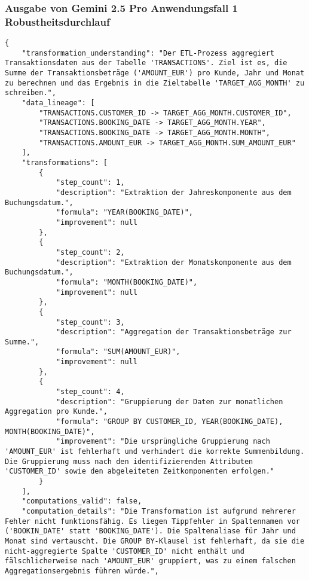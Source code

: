 \subsubsection{Ausgabe von Gemini 2.5 Pro Anwendungsfall 1 Robustheitsdurchlauf}\label{anhang:subsubsec:gemini_case1_prompt3}
\begin{lstlisting}[caption={Ausgabe: Gemini 2.5 Pro Anwendungsfall 1 Robustheitsdurchlauf},label={gemini_case1_prompt3}]
{
    "transformation_understanding": "Der ETL-Prozess aggregiert Transaktionsdaten aus der Tabelle 'TRANSACTIONS'. Ziel ist es, die Summe der Transaktionsbeträge ('AMOUNT_EUR') pro Kunde, Jahr und Monat zu berechnen und das Ergebnis in die Zieltabelle 'TARGET_AGG_MONTH' zu schreiben.",
    "data_lineage": [
        "TRANSACTIONS.CUSTOMER_ID -> TARGET_AGG_MONTH.CUSTOMER_ID",
        "TRANSACTIONS.BOOKING_DATE -> TARGET_AGG_MONTH.YEAR",
        "TRANSACTIONS.BOOKING_DATE -> TARGET_AGG_MONTH.MONTH",
        "TRANSACTIONS.AMOUNT_EUR -> TARGET_AGG_MONTH.SUM_AMOUNT_EUR"
    ],
    "transformations": [
        {
            "step_count": 1,
            "description": "Extraktion der Jahreskomponente aus dem Buchungsdatum.",
            "formula": "YEAR(BOOKING_DATE)",
            "improvement": null
        },
        {
            "step_count": 2,
            "description": "Extraktion der Monatskomponente aus dem Buchungsdatum.",
            "formula": "MONTH(BOOKING_DATE)",
            "improvement": null
        },
        {
            "step_count": 3,
            "description": "Aggregation der Transaktionsbeträge zur Summe.",
            "formula": "SUM(AMOUNT_EUR)",
            "improvement": null
        },
        {
            "step_count": 4,
            "description": "Gruppierung der Daten zur monatlichen Aggregation pro Kunde.",
            "formula": "GROUP BY CUSTOMER_ID, YEAR(BOOKING_DATE), MONTH(BOOKING_DATE)",
            "improvement": "Die ursprüngliche Gruppierung nach 'AMOUNT_EUR' ist fehlerhaft und verhindert die korrekte Summenbildung. Die Gruppierung muss nach den identifizierenden Attributen 'CUSTOMER_ID' sowie den abgeleiteten Zeitkomponenten erfolgen."
        }
    ],
    "computations_valid": false,
    "computation_details": "Die Transformation ist aufgrund mehrerer Fehler nicht funktionsfähig. Es liegen Tippfehler in Spaltennamen vor ('BOOKIN_DATE' statt 'BOOKING_DATE'). Die Spaltenaliase für Jahr und Monat sind vertauscht. Die GROUP BY-Klausel ist fehlerhaft, da sie die nicht-aggregierte Spalte 'CUSTOMER_ID' nicht enthält und fälschlicherweise nach 'AMOUNT_EUR' gruppiert, was zu einem falschen Aggregationsergebnis führen würde.",

\end{lstlisting}
